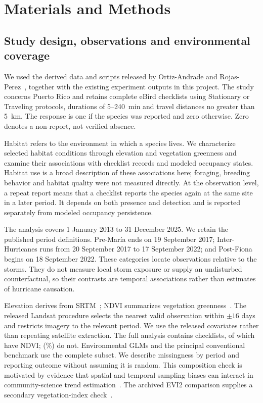 \section{Materials and Methods}
\subsection{Study design, observations and environmental coverage}
We used the derived data and scripts released by Ortiz-Andrade and Rojas-Perez~\cite{ortiz2026}, together with the existing experiment outputs in this project. The study concerns Puerto Rico and retains complete eBird checklists using Stationary or Traveling protocols, durations of 5--240~min and travel distances no greater than 5~km. The response is one if the species was reported and zero otherwise. Zero denotes a non-report, not verified absence.

Habitat refers to the environment in which a species lives. We characterize selected habitat conditions through elevation and vegetation greenness and examine their associations with checklist records and modeled occupancy states. Habitat use is a broad description of these associations here; foraging, breeding behavior and habitat quality were not measured directly. At the observation level, a repeat report means that a checklist reports the species again at the same site in a later period. It depends on both presence and detection and is reported separately from modeled occupancy persistence.

The analysis covers 1 January 2013 to 31 December 2025. We retain the published period definitions. Pre-Mar\'ia ends on 19 September 2017; Inter-Hurricanes runs from 20 September 2017 to 17 September 2022; and Post-Fiona begins on 18 September 2022. These categories locate observations relative to the storms. They do not measure local storm exposure or supply an undisturbed counterfactual, so their contrasts are temporal associations rather than estimates of hurricane causation.

Elevation derives from SRTM~\cite{farr2007}; NDVI summarizes vegetation greenness~\cite{tucker1979}. The released Landsat procedure selects the nearest valid observation within $\pm16$ days and restricts imagery to the relevant period. We use the released covariates rather than repeating satellite extraction. The full analysis contains \nChecklists{} checklists, of which \nComplete{} have NDVI; \nMissingNDVI{} (\nMissingPct{}\%) do not. Environmental GLMs and the principal conventional benchmark use the complete subset. We describe missingness by period and reporting outcome without assuming it is random. This composition check is motivated by evidence that spatial and temporal sampling biases can interact in community-science trend estimation~\cite{backstrom2025}. The archived EVI2 comparison supplies a secondary vegetation-index check~\cite{jiang2008}.

